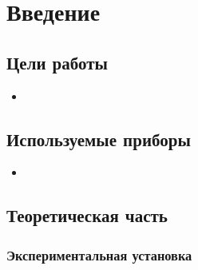 \section{Введение}
\subsection{Цели работы} 
\begin{itemize}
    \item 
\end{itemize}

\subsection{Используемые приборы}
\begin{itemize}
    \item 
\end{itemize}

\subsection{Теоретическая часть}



\subsubsection{Экспериментальная установка}

